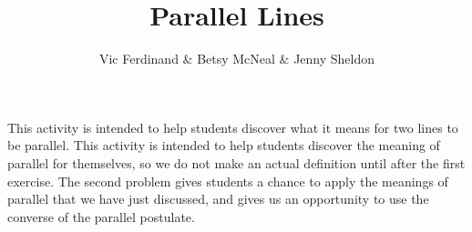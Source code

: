 \documentclass{ximera}
\title{Parallel Lines}
\author{Vic Ferdinand \& Betsy McNeal \& Jenny Sheldon}
\begin{document}
\begin{abstract}\end{abstract}
\maketitle

\begin{instructorIntro}
This activity is intended to help students discover what it means for two lines to be parallel.  This activity is intended to help students discover the meaning of parallel for themselves, so we do not make an actual definition until after the first exercise.  The second problem gives students a chance to apply the meanings of parallel that we have just discussed, and gives us an opportunity to use the converse of the parallel postulate.


\end{instructorIntro}
\end{document}
